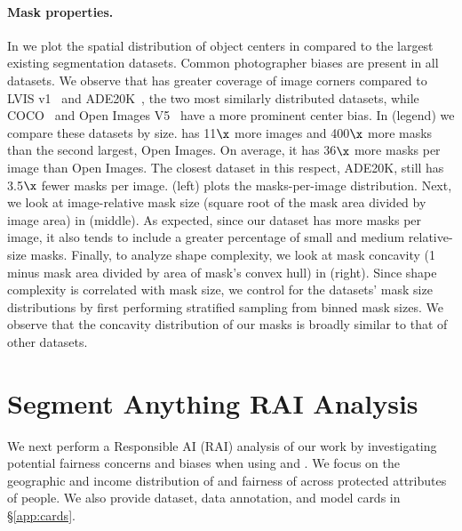 \paragraph{Mask properties.} In  we plot the spatial distribution of object centers in \sad compared to the largest existing segmentation datasets. Common photographer biases are present in all datasets. We observe that \sad has greater coverage of image corners compared to LVIS v1~\cite{Gupta2019} and ADE20K~\cite{Zhou2019}, the two most similarly distributed datasets, while COCO~\cite{Lin2014} and Open Images V5~\cite{OpenImages} have a more prominent center bias. In  (legend) we compare these datasets by size. \sad has 11$\x$ more images and 400$\x$ more masks than the second largest, Open Images. On average, it has 36$\x$ more masks per image than Open Images. The closest dataset in this respect, ADE20K, still has 3.5$\x$ fewer masks per image.  (left) plots the masks-per-image distribution. Next, we look at image-relative mask size (square root of the mask area divided by image area) in  (middle). As expected, since our dataset has more masks per image, it also tends to include a greater percentage of small and medium relative-size masks. Finally, to analyze shape complexity, we look at mask concavity (1 minus mask area divided by area of mask's convex hull) in  (right). Since shape complexity is correlated with mask size, we control for the datasets' mask size distributions by first performing stratified sampling from binned mask sizes. We observe that the concavity distribution of our masks is broadly similar to that of other datasets.

\section{Segment Anything RAI Analysis}\label{sec:rai}

We next perform a Responsible AI (RAI) analysis of our work by investigating potential fairness concerns and biases when using \sad and \sam. We focus on the geographic and income distribution of \sad and fairness of \sam across protected attributes of people. We also provide dataset, data annotation, and model cards in \S\ref{app:cards}.

